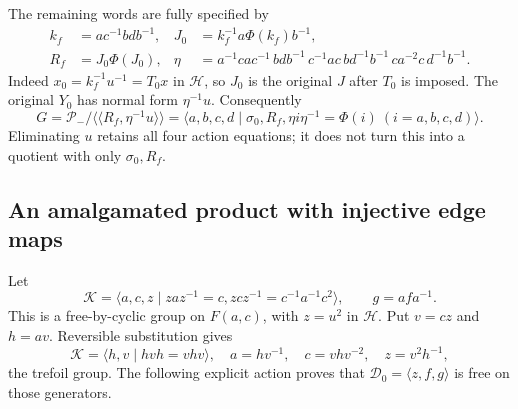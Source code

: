 \documentclass[11pt]{amsart}
\theoremstyle{definition}
\theoremstyle{remark}
\newcommand{\nc}[1]{\langle\!\langle #1\rangle\!\rangle}
\begin{document}
The remaining words are fully specified by
\[
\begin{aligned}
 k_f&=ac^{-1}bdb^{-1},&
 J_0&=k_f^{-1}a\Phi(k_f)b^{-1},\\
 R_f&=J_0\Phi(J_0),&
 \eta&=a^{-1}cac^{-1}\,bdb^{-1}\,c^{-1}ac\,
           bd^{-1}b^{-1}\,ca^{-2}c\,d^{-1}b^{-1}.
\end{aligned}
\]
Indeed $x_0=k_f^{-1}u^{-1}=T_0x$ in $\mathcal H$, so $J_0$
is the original $J$ after $T_0$ is imposed. The original $Y_0$
has normal form $\eta^{-1}u$. Consequently
\begin{equation}\label{eq:trefoil-final}
 G=\mathcal P_-/\nc{R_f,\eta^{-1}u}
  =\langle a,b,c,d\mid \sigma_0,R_f,
       \eta i\eta^{-1}=\Phi(i)\ (i=a,b,c,d)\rangle.
\end{equation}
Eliminating $u$ retains all four action equations; it does not turn
this into a quotient with only $\sigma_0,R_f$.

\subsection{An amalgamated product with injective edge maps}
Let
\[
 \mathcal K=\langle a,c,z\mid zaz^{-1}=c,
                              zcz^{-1}=c^{-1}a^{-1}c^2\rangle,
 \qquad g=afa^{-1}.
\]
This is a free-by-cyclic group on $F(a,c)$, with $z=u^2$ in
$\mathcal H$. Put $v=cz$ and $h=av$. Reversible substitution gives
\[
 \mathcal K=\langle h,v\mid hvh=vhv\rangle,
 \quad a=hv^{-1},\quad c=vhv^{-2},\quad z=v^2h^{-1},
\]
the trefoil group. The following explicit action proves that
$\mathcal D_0=\langle z,f,g\rangle$ is free on those generators.
\end{document}
